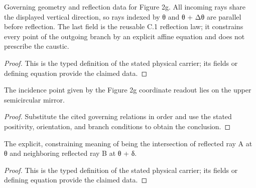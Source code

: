 \begin{definition}
  \label{def:physics:IPhO_2026_2_C_3:aux015}
  Governing geometry and reflection data for Figure 2g. All incoming rays share the displayed vertical direction, so rays indexed by θ and θ + Δθ are parallel before reflection. The last field is the reusable C.1 reflection law; it constrains every point of the outgoing branch by an explicit affine equation and does not prescribe the caustic.
\end{definition}
\begin{proof}
  This is the typed definition of the stated physical carrier; its fields or defining equation provide the claimed data.
\end{proof}

\begin{lemma}
  \label{lem:physics:IPhO_2026_2_C_3:aux016}
  The incidence point given by the Figure 2g coordinate readout lies on the upper semicircular mirror.
\end{lemma}
\begin{proof}
  Substitute the cited governing relations in order and use the stated positivity, orientation, and branch conditions to obtain the conclusion.
\end{proof}

\begin{definition}
  \label{def:physics:IPhO_2026_2_C_3:aux017}
  The explicit, constraining meaning of being the intersection of reflected ray A at θ and neighboring reflected ray B at θ + δ.
\end{definition}
\begin{proof}
  This is the typed definition of the stated physical carrier; its fields or defining equation provide the claimed data.
\end{proof}

